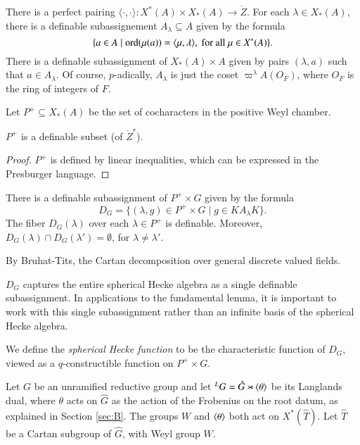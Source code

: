 There is a perfect pairing $\langle\cdot,\cdot\rangle:X^*(A)\times X_*(A) \to \ring{Z}$.
For each $\lambda\in X_*(A)$, there is a definable subassignement $A_\lambda \subseteq A$ given by the formula
\[
\{ a \in A \mid {\operatorname{ord}}(\mu(a)) = \langle{\mu,\lambda}\rangle,\text{ for all } \mu\in X^*(A) \}.
\]
There is a definable subassignment of $X_*(A)\times A$
given by pairs $(\lambda,a)$  such that $a\in A_\lambda$.  
Of course, $p$-adically, $A_\lambda$ is just the coset $\varpi^\lambda A(O_F)$, where $O_F$ is the ring of integers of $F$.

Let $P^+\subseteq X_*(A)$ be the set of cocharacters in the positive Weyl chamber.

\begin{lemma} $P^+$ is a definable subset (of $\ring{Z}^r$).
\end{lemma}

\begin{proof} $P^+$ is defined by linear inequalities, which can be expressed in the Presburger language.
\end{proof}


\begin{lemma} There is a definable subassignment of $P^+\times G$ given by the formula
\[
D_G = \{(\lambda,g)\in P^+\times G \mid g \in K A_\lambda K \}.
\]
The fiber $D_G(\lambda)$ over each $\lambda\in P^+$ is definable.  Moreover,
$D_G(\lambda)\cap D_G(\lambda') = \emptyset$, for $\lambda\ne \lambda'$.
\end{lemma}

By Bruhat-Tits,  the Cartan decomposition over general discrete valued fields.

\begin{remark}   $D_G$ captures the entire spherical Hecke algebra as a single
definable subassignment.  In applications to the fundamental lemma, 
it is important to work with this single subassignment
rather than an infinite basis of the spherical Hecke algebra.
\end{remark}

We define the {\it spherical Hecke function} to be the characteristic function of $D_G$, viewed as a $q$-constructible function
on $P^+\times G$.

Let $G$ be an unramified reductive group and let ${}^LG = \hat G\rtimes \langle{\theta}\rangle$ be its Langlands dual, where
$\theta$ acts on $\hat G$ as the action of the Frobenius on the root datum, as explained in Section \ref{sec:B}.
The groups $W$ and $\langle{\theta}\rangle$ both act on $X^*(\hat T)$.  
Let $\hat T$ be a Cartan subgroup of $\hat G$, with Weyl group $W$.


